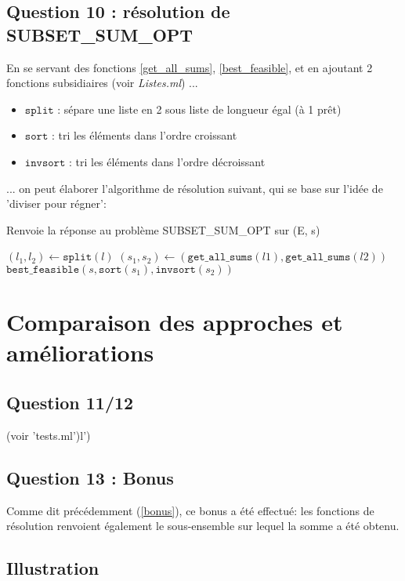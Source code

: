 \documentclass[10pt]{article}
\let\oldReturn\Return
\renewcommand{\Return}{\State\oldReturn}
\begin{document}
			\subsection{Question 10 : résolution de SUBSET\_SUM\_OPT}
				En se servant des fonctions \ref{get_all_sums}, \ref{best_feasible},
				et en ajoutant 2 fonctions subsidiaires (voir \textit{Listes.ml}) ...
				\begin{itemize}[label=-]
					\setlength\itemsep{0.1em}
					\item $\mathtt{split}$ : sépare une liste en 2 sous liste de longueur égal (à 1 prêt)
					\item $\mathtt{sort}$ : tri les éléments dans l'ordre croissant
					\item $\mathtt{invsort}$ : tri les éléments dans l'ordre décroissant
				\end{itemize}
				... on peut élaborer l'algorithme de résolution suivant, qui se base sur l'idée de 'diviser pour régner':
				\begin{algorithm}
					\caption{Renvoie la réponse au problème SUBSET\_SUM\_OPT sur (E, s)}
					\begin{algorithmic}[1]
							\State $(l_1, l_2) \leftarrow \mathtt{split}(l)$
							\State $(s_1, s_2) \leftarrow (\mathtt{get\_all\_sums}(l1), \mathtt{get\_all\_sums}(l2))$
							\Return $\mathtt{best\_feasible}(s, \mathtt{sort}(s_1), \mathtt{invsort}(s_2))$
						\EndFunction
					\end{algorithmic}
				\end{algorithm}
				
		\section{Comparaison des approches et améliorations}
			\subsection{Question 11/12}
				(voir 'tests.ml')l')
			\subsection{Question 13 : Bonus}
				Comme dit précédemment (\ref{bonus}), ce bonus a été effectué: les fonctions de résolution renvoient également
				le sous-ensemble sur lequel la somme a été obtenu.

			\subsection{Illustration}\label{illustrations}
			
\end{document}
